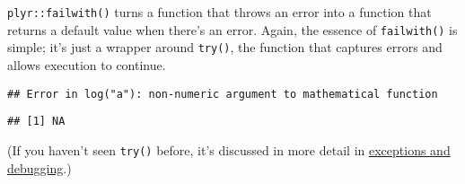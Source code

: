 \texttt{plyr::failwith()} turns a function that throws an error into a
function that returns a default value when there's an error. Again, the
essence of \texttt{failwith()} is simple; it's just a wrapper around
\texttt{try()}, the function that captures errors and allows execution
to continue. 

\begin{Shaded}
\begin{Highlighting}[]
\StringTok{ }\NormalTok{(}  \NormalTok{) \{}
\StringTok{ }
    \StringTok{ }
\NormalTok{  \}}
\NormalTok{\}}
\NormalTok{(}\NormalTok{)}
\end{Highlighting}
\end{Shaded}

\begin{verbatim}
## Error in log("a"): non-numeric argument to mathematical function
\end{verbatim}

\begin{Shaded}
\begin{Highlighting}[]
\NormalTok{(}\NormalTok{)}
\end{Highlighting}
\end{Shaded}

\begin{Shaded}
\begin{Highlighting}[]
\NormalTok{(} \NormalTok{)(}\NormalTok{)}
\end{Highlighting}
\end{Shaded}

\begin{verbatim}
## [1] NA
\end{verbatim}

(If you haven't seen \texttt{try()} before, it's discussed in more
detail in \protect\hyperlink{try}{exceptions and debugging}.)


